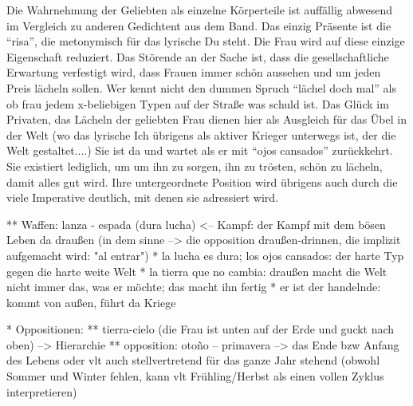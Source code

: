 Die Wahrnehmung der Geliebten als einzelne Körperteile ist auffällig abwesend im Vergleich zu anderen Gedichtent aus dem Band.
Das einzig Präsente ist die ``risa'', die metonymisch für das lyrische Du steht.
Die Frau wird auf diese einzige Eigenschaft reduziert.
Das Störende an der Sache ist, dass die gesellschaftliche Erwartung verfestigt wird, dass Frauen immer schön aussehen und um jeden Preis lächeln sollen.
Wer kennt nicht den dummen Spruch ``lächel doch mal'' als ob frau jedem x-beliebigen Typen auf der Straße was schuld ist.
Das Glück im Privaten, das Lächeln der geliebten Frau dienen hier als Ausgleich für das Übel in der Welt (wo das lyrische Ich übrigens als aktiver Krieger unterwegs ist, der die Welt gestaltet....)
Sie ist da und wartet als er mit ``ojos cansados'' zurückkehrt.
Sie existiert lediglich, um um ihn zu sorgen, ihn zu trösten, schön zu lächeln, damit alles gut wird.
Ihre untergeordnete Position wird übrigens auch durch die viele Imperative deutlich, mit denen sie adressiert wird.

        ** Waffen: lanza - espada (dura lucha) <-- Kampf: der Kampf mit dem bösen Leben da draußen (in dem sinne --> die opposition draußen-drinnen, die implizit aufgemacht wird: "al entrar")
      * la lucha es dura; los ojos cansados: der harte Typ gegen die harte weite Welt
      * la tierra que no cambia: draußen macht die Welt nicht immer das, was er möchte; das macht ihn fertig
      * er ist der handelnde: kommt von außen, führt da Kriege

      * Oppositionen:
        ** tierra-cielo (die Frau ist unten auf der Erde und guckt nach oben) --> Hierarchie
        ** opposition: otoño -- primavera --> das Ende bzw Anfang des Lebens oder vlt auch stellvertretend für das ganze Jahr stehend (obwohl Sommer und Winter fehlen, kann vlt Frühling/Herbst als einen vollen Zyklus interpretieren)

